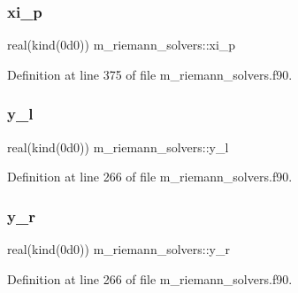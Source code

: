 \subsubsection{\texorpdfstring{xi\+\_\+p}{xi\_p}}
{\footnotesize\ttfamily real(kind(0d0)) m\+\_\+riemann\+\_\+solvers\+::xi\+\_\+p}



Definition at line 375 of file m\+\_\+riemann\+\_\+solvers.\+f90.

\mbox{\label{namespacem__riemann__solvers_ad79d372c1bc1971b870ab2c455d9ff90}} 
\subsubsection{\texorpdfstring{y\+\_\+l}{y\_l}}
{\footnotesize\ttfamily real(kind(0d0)) m\+\_\+riemann\+\_\+solvers\+::y\+\_\+l}



Definition at line 266 of file m\+\_\+riemann\+\_\+solvers.\+f90.

\mbox{\label{namespacem__riemann__solvers_aef2c7eeabded0734aaa0cd95adac91ab}} 
\subsubsection{\texorpdfstring{y\+\_\+r}{y\_r}}
{\footnotesize\ttfamily real(kind(0d0)) m\+\_\+riemann\+\_\+solvers\+::y\+\_\+r}



Definition at line 266 of file m\+\_\+riemann\+\_\+solvers.\+f90.

